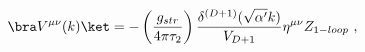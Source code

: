 \begin{equation}
 \bra V^{\mu\nu}(k)\ket = -\left( \frac{g_{str}}{4\pi\tau_2} \right)
 \frac{\delta^{(D+1)}(\sqrt{\alpha'}k)}{V_{D+1}}
 \eta^{\mu\nu} Z_{1-loop} \ ,
\end{equation}

